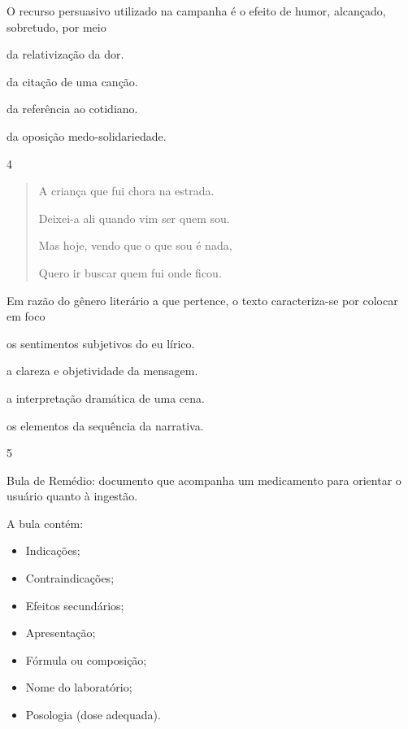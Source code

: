 
O recurso persuasivo utilizado na campanha é o efeito de humor,
alcançado, sobretudo, por meio

\begin{escolha}
\item da relativização da dor.
\item da citação de uma canção.
\item da referência ao cotidiano.
\item da oposição medo-solidariedade.
\end{escolha}

\num{4}

\begin{quote}
A criança que fui chora na estrada.

Deixei-a ali quando vim ser quem sou.

Mas hoje, vendo que o que sou é nada,

Quero ir buscar quem fui onde ficou.
\end{quote}


Em razão do gênero literário a que pertence, o texto caracteriza-se por
colocar em foco

\begin{escolha}
\item os sentimentos subjetivos do eu lírico.

\item a clareza e objetividade da mensagem.

\item a interpretação dramática de uma cena.

\item os elementos da sequência da narrativa.
\end{escolha}

\num{5}

Bula de Remédio: documento que acompanha um medicamento para orientar o
usuário quanto à ingestão.

A bula contém:

\begin{itemize}
\item
  Indicações;
\item
  Contraindicações;
\item
  Efeitos secundários;
\item
  Apresentação;
\item
  Fórmula ou composição;
\item
  Nome do laboratório;
\item
  Posologia (dose adequada).
\end{itemize}

